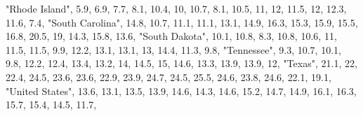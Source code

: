 \documentclass[
]{book}
\newenvironment{Shaded}{\begin{snugshade}}{\end{snugshade}}
\newcommand{\DecValTok}[1]{\textcolor[rgb]{0.00,0.00,0.81}{#1}}
\newcommand{\FloatTok}[1]{\textcolor[rgb]{0.00,0.00,0.81}{#1}}
\newcommand{\NormalTok}[1]{#1}
\newcommand{\StringTok}[1]{\textcolor[rgb]{0.31,0.60,0.02}{#1}}
\begin{document}
\begin{Shaded}
\begin{Highlighting}[]
          \StringTok{"Rhode Island"}\NormalTok{,  }\FloatTok{5.9}\NormalTok{,  }\FloatTok{6.9}\NormalTok{,  }\FloatTok{7.7}\NormalTok{,  }\FloatTok{8.1}\NormalTok{, }\FloatTok{10.4}\NormalTok{,   }\DecValTok{10}\NormalTok{, }\FloatTok{10.7}\NormalTok{,  }\FloatTok{8.1}\NormalTok{, }\FloatTok{10.5}\NormalTok{,   }\DecValTok{11}\NormalTok{,   }\DecValTok{12}\NormalTok{, }\FloatTok{11.5}\NormalTok{,   }\DecValTok{12}\NormalTok{, }\FloatTok{12.3}\NormalTok{, }\FloatTok{11.6}\NormalTok{,  }\FloatTok{7.4}\NormalTok{,}
        \StringTok{"South Carolina"}\NormalTok{, }\FloatTok{14.8}\NormalTok{, }\FloatTok{10.7}\NormalTok{, }\FloatTok{11.1}\NormalTok{, }\FloatTok{11.1}\NormalTok{, }\FloatTok{13.1}\NormalTok{, }\FloatTok{14.9}\NormalTok{, }\FloatTok{16.3}\NormalTok{, }\FloatTok{15.3}\NormalTok{, }\FloatTok{15.9}\NormalTok{, }\FloatTok{15.5}\NormalTok{, }\FloatTok{16.8}\NormalTok{, }\FloatTok{20.5}\NormalTok{,   }\DecValTok{19}\NormalTok{, }\FloatTok{14.3}\NormalTok{, }\FloatTok{15.8}\NormalTok{, }\FloatTok{13.6}\NormalTok{,}
          \StringTok{"South Dakota"}\NormalTok{, }\FloatTok{10.1}\NormalTok{, }\FloatTok{10.8}\NormalTok{,  }\FloatTok{8.3}\NormalTok{, }\FloatTok{10.8}\NormalTok{, }\FloatTok{10.6}\NormalTok{,   }\DecValTok{11}\NormalTok{, }\FloatTok{11.5}\NormalTok{, }\FloatTok{11.5}\NormalTok{,  }\FloatTok{9.9}\NormalTok{, }\FloatTok{12.2}\NormalTok{, }\FloatTok{13.1}\NormalTok{, }\FloatTok{13.1}\NormalTok{,   }\DecValTok{13}\NormalTok{, }\FloatTok{14.4}\NormalTok{, }\FloatTok{11.3}\NormalTok{,  }\FloatTok{9.8}\NormalTok{,}
             \StringTok{"Tennessee"}\NormalTok{,  }\FloatTok{9.3}\NormalTok{, }\FloatTok{10.7}\NormalTok{, }\FloatTok{10.1}\NormalTok{,  }\FloatTok{9.8}\NormalTok{, }\FloatTok{12.2}\NormalTok{, }\FloatTok{12.4}\NormalTok{, }\FloatTok{13.4}\NormalTok{, }\FloatTok{13.2}\NormalTok{,   }\DecValTok{14}\NormalTok{, }\FloatTok{14.5}\NormalTok{,   }\DecValTok{15}\NormalTok{, }\FloatTok{14.6}\NormalTok{, }\FloatTok{13.3}\NormalTok{, }\FloatTok{13.9}\NormalTok{, }\FloatTok{13.9}\NormalTok{,   }\DecValTok{12}\NormalTok{,}
                 \StringTok{"Texas"}\NormalTok{, }\FloatTok{21.1}\NormalTok{,   }\DecValTok{22}\NormalTok{, }\FloatTok{22.4}\NormalTok{, }\FloatTok{24.5}\NormalTok{, }\FloatTok{23.6}\NormalTok{, }\FloatTok{23.6}\NormalTok{, }\FloatTok{22.9}\NormalTok{, }\FloatTok{23.9}\NormalTok{, }\FloatTok{24.7}\NormalTok{, }\FloatTok{24.5}\NormalTok{, }\FloatTok{25.5}\NormalTok{, }\FloatTok{24.6}\NormalTok{, }\FloatTok{23.8}\NormalTok{, }\FloatTok{24.6}\NormalTok{, }\FloatTok{22.1}\NormalTok{, }\FloatTok{19.1}\NormalTok{,}
         \StringTok{"United States"}\NormalTok{, }\FloatTok{13.6}\NormalTok{, }\FloatTok{13.1}\NormalTok{, }\FloatTok{13.5}\NormalTok{, }\FloatTok{13.9}\NormalTok{, }\FloatTok{14.6}\NormalTok{, }\FloatTok{14.3}\NormalTok{, }\FloatTok{14.6}\NormalTok{, }\FloatTok{15.2}\NormalTok{, }\FloatTok{14.7}\NormalTok{, }\FloatTok{14.9}\NormalTok{, }\FloatTok{16.1}\NormalTok{, }\FloatTok{16.3}\NormalTok{, }\FloatTok{15.7}\NormalTok{, }\FloatTok{15.4}\NormalTok{, }\FloatTok{14.5}\NormalTok{, }\FloatTok{11.7}\NormalTok{,}

\end{Highlighting}
\end{Shaded}
\end{document}

